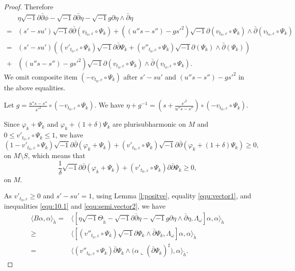 \begin{proof}
Therefore
\begin{equation}
\label{equ:vector1}
\begin{split}
&\eta\sqrt{-1}\partial\bar\partial\phi-\sqrt{-1}\partial\bar\partial\eta-
\sqrt{-1}g\partial\eta\wedge\bar\partial\eta
\\=&(s'-su')\sqrt{-1}\partial\bar{\partial}(v_{t_0,\varepsilon}\circ \Psi_{k})
+((u''s-s'')-gs'^{2})\sqrt{-1}\partial(v_{t_0,\varepsilon}\circ \Psi_{k})\wedge\bar{\partial}
(v_{t_0,\varepsilon}\circ \Psi_{k})
\\=&
(s'-su')((v'_{t_0,\varepsilon}\circ\Psi_{k})\sqrt{-1}\partial\bar{\partial}\Psi_{k}+
(v''_{t_0,\varepsilon}\circ \Psi_{k})\sqrt{-1}\partial(\Psi_{k})
\wedge\bar{\partial}(\Psi_{k}))
\\+&((u''s-s'')-gs'^{2})\sqrt{-1}\partial(v_{t_0,\varepsilon}\circ \Psi_{k})
\wedge\bar{\partial}(v_{t_0,\varepsilon}\circ \Psi_{k}).
\end{split}
\end{equation}
We omit composite item $(-v_{t_0,\varepsilon}\circ \Psi_{k})$ after $s'-su'$ and $(u''s-s'')-gs'^{2}$
in the above equalities.

Let $g=\frac{u''s-s''}{s'^{2}}\circ(-v_{t_0,\varepsilon}\circ \Psi_{k})$.
We have $\eta+g^{-1}=(s+\frac{s'^{2}}{u''s-s''})\circ(-v_{t_0,\varepsilon}\circ \Psi_{k})$.

Since $\varphi_{k}+\Psi_{k}$ and $\varphi_{k}+(1+\delta)\Psi_{k}$ are plurisubharmonic on $M$ and
$0\leq v'_{t_{0},\varepsilon}\circ\Psi_{k}\leq1$,
we have
\begin{equation}
(1-v'_{t_0,\varepsilon}\circ\Psi_{k})\sqrt{-1}\partial\bar\partial(\varphi_{k}+\Psi_{k})+
(v'_{t_0,\varepsilon}\circ\Psi_{k})\sqrt{-1}\partial\bar\partial(\varphi_{k}+(1+\delta)\Psi_{k})\geq 0,
\end{equation}
on $M\setminus S$, which means that
\begin{equation}
\label{equ:semi.vector2}
\frac{1}{\delta}\sqrt{-1}\partial\bar\partial(\varphi_{k}+\Psi_{k})+(v'_{t_0,\varepsilon}
\circ\Psi_{k})\partial\bar{\partial}\Psi_{k}\geq 0,
\end{equation}
on $M$.

As $v'_{t_0,\varepsilon}\geq 0$  and $s'-su'=1$, using Lemma
\ref{l:positve}, equality \ref{equ:vector1}, and inequalities
\ref{equ:10.1} and \ref{equ:semi.vector2}, we have
\begin{equation}
\label{equ:semi.vector3}
\begin{split}
\langle B\alpha, \alpha\rangle_{\tilde{h}}=&\langle[\eta\sqrt{-1}\Theta_{\tilde{h}}-\sqrt{-1}\partial\bar\partial
\eta-\sqrt{-1}g\partial\eta\wedge\bar\partial\eta,\Lambda_{\omega}]
\alpha,\alpha\rangle_{\tilde{h}}
\\\geq&
\langle[(v''_{t_0,\varepsilon}\circ \Psi_{k})
\sqrt{-1}\partial\Psi_{k}\wedge\bar{\partial}\Psi_{k},\Lambda_{\omega}]\alpha,\alpha\rangle_{\tilde{h}}
\\=&\langle (v''_{t_{0},\varepsilon}\circ \Psi_{k}) \bar\partial\Psi_{k}\wedge
(\alpha\llcorner(\bar\partial\Psi_{k})^\sharp\big ),\alpha\rangle_{\tilde{h}}.
\end{split}
\end{equation}


\end{proof}
